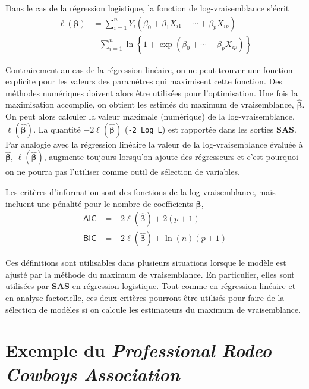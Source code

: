 \documentclass[
  11pt,
  letterpaper,
]{book}
\theoremstyle{definition}
\theoremstyle{definition}
\theoremstyle{definition}
\theoremstyle{remark}
\begin{document}
Dans le cas de la régression logistique, la fonction de log-vraisemblance s'écrit
\begin{align*}
 \ell(\boldsymbol{\beta}) &= \sum_{i=1}^n Y_i ( \beta_0 + \beta_1 X_{i1} + \cdots + \beta_p X_{ip}) \\&- \sum_{i=1}^n \ln\left\{1+\exp(\beta_0 + \cdots + \beta_pX_{ip})\right\}
\end{align*}

Contrairement au cas de la régression linéaire, on ne peut trouver une fonction explicite pour les valeurs des paramètres qui maximisent cette fonction. Des méthodes numériques doivent alors être utilisées pour l'optimisation. Une fois la maximisation accomplie, on obtient les estimés du maximum de vraisemblance, \(\widehat{\boldsymbol{\beta}}\). On peut alors calculer la valeur maximale (numérique) de la log-vraisemblance, \(\ell(\widehat{\boldsymbol{\beta}})\). La quantité \(-2\ell(\widehat{\boldsymbol{\beta}})\) (\texttt{-2\ Log\ L}) est rapportée dans les sorties \textbf{SAS}. Par analogie avec la régression linéaire la valeur de la log-vraisemblance évaluée à \(\widehat{\boldsymbol{\beta}}\), \(\ell(\widehat{\boldsymbol{\beta}})\), augmente toujours lorsqu'on ajoute des régresseurs et c'est pourquoi on ne pourra pas l'utiliser comme outil de sélection de variables.

Les critères d'information sont des fonctions de la log-vraisemblance, mais incluent une pénalité pour le nombre de coefficients \(\boldsymbol{\beta}\),
\begin{align*}
 \mathsf{AIC} & = -2 \ell(\widehat{\boldsymbol{\beta}}) + 2(p+1)\\
 \mathsf{BIC} & = -2 \ell(\widehat{\boldsymbol{\beta}}) + \ln(n)(p+1)
\end{align*}

Ces définitions sont utilisables dans plusieurs situations lorsque le modèle est ajusté par la méthode du maximum de vraisemblance. En particulier, elles sont utilisées par \textbf{SAS} en régression logistique. Tout comme en régression linéaire et en analyse factorielle, ces deux critères pourront être utilisés pour faire de la sélection de modèles si on calcule les estimateurs du maximum de vraisemblance.

\hypertarget{cowboy}{%
\section{\texorpdfstring{Exemple du \emph{Professional Rodeo Cowboys Association}}{Exemple du Professional Rodeo Cowboys Association}}\label{cowboy}}
\end{document}
